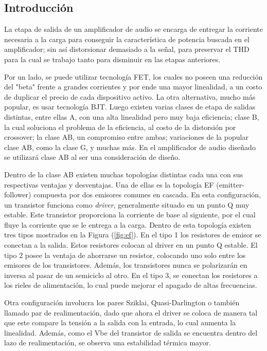 



\subsection{Introducción}

La etapa de salida de un amplificador de audio se encarga de entregar la corriente necesaria a la carga para conseguir la característica de potencia buscada en el amplificador; sin así distorsionar demasiado a la señal, para preservar el THD para la cual se trabajo tanto para disminuir en las etapas anteriores.

Por un lado, se puede utilizar tecnología FET, los cuales no poseen una reducción del "beta" frente a grandes corrientes y por ende una mayor linealidad, a un costo de duplicar el precio de cada dispositivo activo. La otra alternativa, mucho más popular, es usar tecnología BJT. Luego existen varias clases de etapa de salidas distintas, entre ellas A, con una alta linealidad pero muy baja eficiencia; clase B, la cual soluciona el problema de la eficiencia, al costo de la distorsión por crossover; la clase AB, un compromiso entre ambas; variaciones de la popular clase AB, como la clase G, y muchas más.
En el amplificador de audio diseñado se utilizará clase AB al ser una consideración de diseño.

Dentro de la clase AB existen muchas topologías distintas cada una con sus respectivas ventajas y desventajas. Una de ellas es la topología EF (emitter-follower) compuesta por dos emisores comunes en cascada. En esta configuración, un transistor funciona como \textit{driver}, generalmente situado en un punto Q muy estable. Este transistor proporciona la corriente de base al siguiente, por el cual fluye la corriente que se le entrega a la carga. Dentro de esta topología existen tres tipos mostrados en la Figura (\ref{fig:ef}). En el tipo 1 los resistores de emisor se conectan a la salida. Estos resistores colocan al driver en un punto Q estable. El tipo 2 posee la ventaja de ahorrarse un resistor, colocando uno solo entre los emisores de los transistores. Además, los transistores nunca se polarizarán en inversa al pasar de un semiciclo al otro. En el tipo 3, se conectan los resistores a los rieles de alimentación, lo cual puede mejorar el apagado de altas frecuencias.

Otra configuración involucra los pares Sziklai, Quasi-Darlington o también llamado par de realimentación, dado que ahora el driver se coloca de manera tal que este compare la tensión a la salida con la entrada, lo cual aumenta la linealidad. Además, como el Vbe del transistor de salida se encuentra dentro del lazo de realimentación, se observa una estabilidad térmica mayor.

